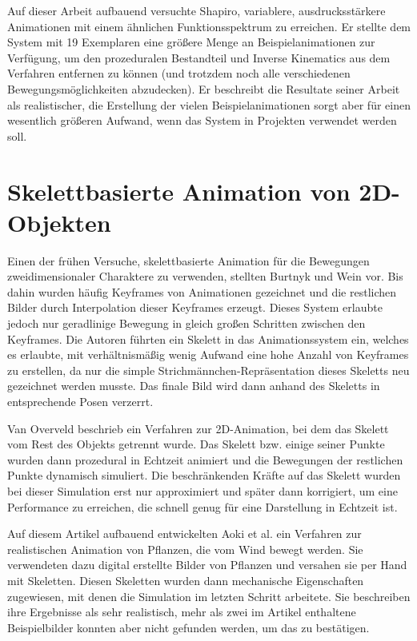Auf dieser Arbeit aufbauend versuchte Shapiro\cite{shapiro2011building}, variablere, aus\-drucks\-stär\-ke\-re Animationen mit einem ähnlichen Funktionsspektrum zu erreichen. Er stellte dem System mit 19 Exemplaren eine größere Menge an Beispielanimationen zur Verfügung, um den prozeduralen Bestandteil und Inverse Kinematics aus dem Verfahren entfernen zu können (und trotzdem noch alle verschiedenen Bewegungsmöglichkeiten abzudecken). Er beschreibt die Resultate seiner Arbeit als realistischer, die Erstellung der vielen Beispielanimationen sorgt aber für einen wesentlich größeren Aufwand, wenn das System in Projekten verwendet werden soll.

\section{Skelettbasierte Animation von 2D-Objekten}
Einen der frühen Versuche, skelettbasierte Animation für die Bewegungen zweidimensionaler Charaktere zu verwenden, stellten Burtnyk und Wein\cite{burtnyk1976interactive} vor. Bis dahin wurden häufig Keyframes von Animationen gezeichnet und die restlichen Bilder durch Interpolation dieser Keyframes erzeugt. Dieses System erlaubte jedoch nur geradlinige Bewegung in gleich großen Schritten zwischen den Keyframes. Die Autoren führten ein Skelett in das Animationssystem ein, welches es erlaubte, mit verhältnismäßig wenig Aufwand eine hohe Anzahl von Keyframes zu erstellen, da nur die simple Strichmännchen-Repräsentation dieses Skeletts neu gezeichnet werden musste. Das finale Bild wird dann anhand des Skeletts in entsprechende Posen verzerrt.

Van Overveld\cite{van1990technique} beschrieb ein Verfahren zur 2D-Animation, bei dem das Skelett vom Rest des Objekts getrennt wurde. Das Skelett bzw. einige seiner Punkte wurden dann prozedural in Echtzeit animiert und die Bewegungen der restlichen Punkte dynamisch simuliert. Die beschränkenden Kräfte auf das Skelett wurden bei dieser Simulation erst nur approximiert und später dann korrigiert, um eine Performance zu erreichen, die schnell genug für eine Darstellung in Echtzeit ist.

Auf diesem Artikel aufbauend entwickelten Aoki et al.\cite{aoki1999dynamic} ein Verfahren zur realistischen Animation von Pflanzen, die vom Wind bewegt werden. Sie verwendeten dazu digital erstellte Bilder von Pflanzen und versahen sie per Hand mit Skeletten. Diesen Skeletten wurden dann mechanische Eigenschaften zugewiesen, mit denen die Simulation im letzten Schritt arbeitete. Sie beschreiben ihre Ergebnisse als sehr realistisch, mehr als zwei im Artikel enthaltene Beispielbilder konnten aber nicht gefunden werden, um das zu bestätigen.

